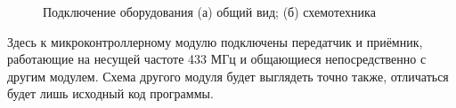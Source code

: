 \begin{figure}[ht]
    \qquad
    \caption{Подключение оборудования (а) общий вид; (б) схемотехника}
    \label{fig:circscheme}
\end{figure}

Здесь к микроконтроллерному модулю подключены передатчик и приёмник, работающие на несущей частоте 433 МГц и общающиеся непосредственно с другим модулем. Схема другого модуля будет выглядеть точно также, отличаться будет лишь исходный код программы.
